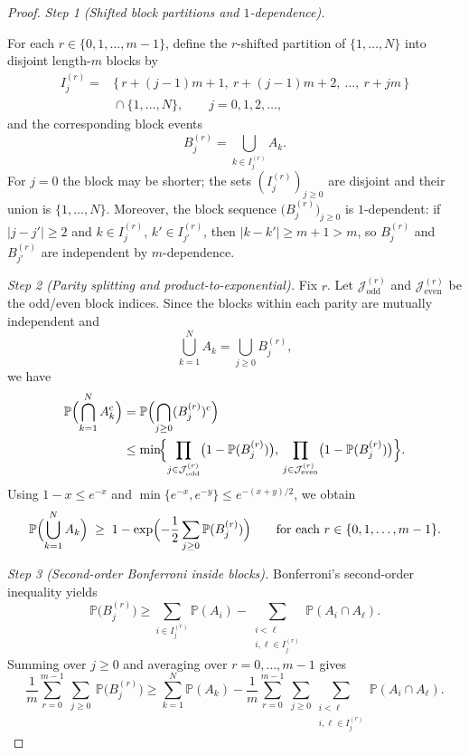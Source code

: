 \documentclass[11pt]{article}
\begin{document}
\begin{proof}
\textit{Step 1 (Shifted block partitions and $1$-dependence).}\par
For each $r\in\{0,1,\dots,m-1\}$, define the $r$-shifted partition of
$\{1,\dots,N\}$ into disjoint length-$m$ blocks by
\[
\begin{aligned}
  I^{(r)}_{j}
  ={}&\{\,r+(j-1)m+1,\ r+(j-1)m+2,\ \dots,\ r+jm\,\}\\
      &{}\cap\{1,\dots,N\}, \qquad j=0,1,2,\dots,
\end{aligned}
\]
and the corresponding block events
\[
  B^{(r)}_{j}=\bigcup_{k\in I^{(r)}_{j}} A_k.
\]
For $j=0$ the block may be shorter; the sets $(I^{(r)}_{j})_{j\ge0}$ are
disjoint and their union is $\{1,\dots,N\}$.  Moreover, the block sequence
$\bigl(B^{(r)}_{j}\bigr)_{j\ge0}$ is $1$-dependent: if $|j-j'|\ge2$ and
$k\in I^{(r)}_{j}$, $k'\in I^{(r)}_{j'}$, then $|k-k'|\ge m+1>m$, so
$B^{(r)}_{j}$ and $B^{(r)}_{j'}$ are independent by $m$-dependence.

\medskip
\textit{Step 2 (Parity splitting and product-to-exponential).}
Fix $r$.  Let $\mathcal{J}_{\mathrm{odd}}^{(r)}$ and
$\mathcal{J}_{\mathrm{even}}^{(r)}$ be the odd/even block indices.  Since the
blocks within each parity are mutually independent and
\[
  \bigcup_{k=1}^N A_k = \bigcup_{j\ge0} B^{(r)}_{j},
\]
we have
\begin{align*}
\mathbb{P}\Bigl(\bigcap_{k=1}^N A_k^{\mathrm c}\Bigr)
  &= \mathbb{P}\Bigl(\bigcap_{j\ge0}(B^{(r)}_{j})^{\mathrm c}\Bigr)\\
  &\le \min\!\Bigl\{
  \prod_{j\in\mathcal{J}_{\mathrm{odd}}^{(r)}}\bigl(1-\mathbb{P}(B^{(r)}_{j})\bigr),\,
  \prod_{j\in\mathcal{J}_{\mathrm{even}}^{(r)}}\bigl(1-\mathbb{P}(B^{(r)}_{j})\bigr)
  \Bigr\}.
\end{align*}
Using $1-x\le e^{-x}$ and $\min\{e^{-x},e^{-y}\}\le e^{-(x+y)/2}$, we obtain
\begin{equation}\label{eq:parity-exp}
  \mathbb{P}\Bigl(\bigcup_{k=1}^N A_k\Bigr)
  \;\ge\; 1-\exp\Bigl(-\frac{1}{2}\sum_{j\ge0}\mathbb{P}(B^{(r)}_{j})\Bigr)
  \qquad\text{for each }r\in\{0,1,\dots,m-1\}.
\end{equation}

\medskip
\textit{Step 3 (Second-order Bonferroni inside blocks).}
Bonferroni’s second-order inequality yields
\[
  \mathbb{P}\bigl(B^{(r)}_{j}\bigr)
  \ge
  \sum_{i\in I^{(r)}_{j}} \mathbb{P}(A_i)
  -
  \sum_{\substack{i<\ell\\ i,\ell\in I^{(r)}_{j}}} \mathbb{P}(A_i\cap A_\ell).
\]
Summing over $j\ge0$ and averaging over $r=0,\dots,m-1$ gives
\begin{equation}\label{eq:block-avg}
  \frac{1}{m}\sum_{r=0}^{m-1}\ \sum_{j\ge0}\ \mathbb{P}\bigl(B^{(r)}_{j}\bigr)
  \ge
  \sum_{k=1}^N \mathbb{P}(A_k)
  -
  \frac{1}{m}\sum_{r=0}^{m-1}\ \sum_{j\ge0}
  \sum_{\substack{i<\ell\\ i,\ell\in I^{(r)}_{j}}} \mathbb{P}(A_i\cap A_\ell).
\end{equation}


\end{proof}
\end{document}

